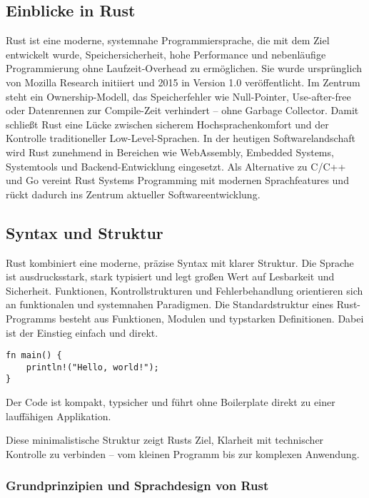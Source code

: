\subsection{Einblicke in Rust}
Rust ist eine moderne, systemnahe Programmiersprache, die mit dem Ziel entwickelt wurde, Speichersicherheit, hohe Performance und nebenläufige Programmierung ohne Laufzeit-Overhead zu ermöglichen. Sie wurde ursprünglich von Mozilla Research initiiert und 2015 in Version 1.0 veröffentlicht. Im Zentrum steht ein Ownership-Modell, das Speicherfehler wie Null-Pointer, Use-after-free oder Datenrennen zur Compile-Zeit verhindert – ohne Garbage Collector. Damit schließt Rust eine Lücke zwischen sicherem Hochsprachenkomfort und der Kontrolle traditioneller Low-Level-Sprachen. In der heutigen Softwarelandschaft wird Rust zunehmend in Bereichen wie WebAssembly, Embedded Systems, Systemtools und Backend-Entwicklung eingesetzt. Als Alternative zu C/C++ und Go vereint Rust Systems Programming mit modernen Sprachfeatures und rückt dadurch ins Zentrum aktueller Softwareentwicklung.

\subsection{Syntax und Struktur}
Rust kombiniert eine moderne, präzise Syntax mit klarer Struktur. Die Sprache ist ausdrucksstark, stark typisiert und legt großen Wert auf Lesbarkeit und Sicherheit. Funktionen, Kontrollstrukturen und Fehlerbehandlung orientieren sich an funktionalen und systemnahen Paradigmen. Die Standardstruktur eines Rust-Programms besteht aus Funktionen, Modulen und typstarken Definitionen. Dabei ist der Einstieg einfach und direkt.

\begin{lstlisting}
fn main() {
    println!("Hello, world!");
}
\end{lstlisting}
Der Code ist kompakt, typsicher und führt ohne Boilerplate direkt zu einer lauffähigen Applikation.

Diese minimalistische Struktur zeigt Rusts Ziel, Klarheit mit technischer Kontrolle zu verbinden – vom kleinen Programm bis zur komplexen Anwendung.
\subsubsection{Grundprinzipien und Sprachdesign von Rust}

